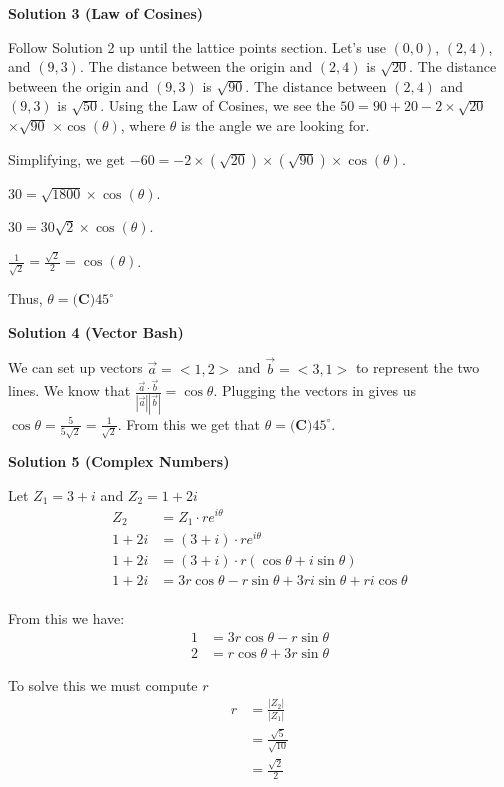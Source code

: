 \begin{enumerate}
\textbf{Solution 3 (Law of Cosines)}

Follow Solution 2 up until the lattice points section. Let's use $(0,0)$, $(2,4)$, and $(9,3)$. The distance between the origin and $(2,4)$ is $\sqrt{20}$. The distance between the origin and $(9,3)$ is $\sqrt{90}$. The distance between $(2,4)$ and $(9,3)$ is $\sqrt{50}$. Using the Law of Cosines, we see the $50 = 90 + 20 - 2\times\sqrt{20}$ $\times\sqrt{90}$ $\times\cos(\theta)$, where $\theta$ is the angle we are looking for. 

 Simplifying, we get $-60 = -2\times(\sqrt{20}) \times(\sqrt{90}) \times\cos(\theta)$.

 $30 =  \sqrt{1800} \times\cos(\theta)$.

 $30 =  30\sqrt{2} \times\cos(\theta)$.

 $\frac{1}{\sqrt{2}} = \frac{\sqrt{2}}{2}= \cos(\theta)$.

 Thus, $\theta = \boxed{\textbf{(C)} 45^\circ}$




\textbf{Solution 4 (Vector Bash)}

We can set up vectors $\vec{a} = <1,2>$ and $\vec{b} = <3,1>$ to represent the two lines. We know that $\frac{\vec{a} \cdot \vec{b}}{|\vec{a}| |\vec{b}|} = \cos \theta$. Plugging the vectors in gives us $\cos \theta = \frac{5}{5\sqrt{2}} = \frac{1}{\sqrt{2}}$.  From this we get that $\theta = \boxed{\textbf{(C)} 45^\circ}$. 

 



\textbf{Solution 5 (Complex Numbers)}

Let $Z_1 = 3 + i$ and $Z_2 = 1 + 2i$
 \begin{align*} Z_2 &= Z_1 \cdot re^{i\theta} \\ 1+2i&=(3+i) \cdot re^{i\theta} \\ 1+2i&=(3 + i) \cdot r(\cos\theta + i\sin\theta) \\ 1+2i&=3r\cos\theta - r\sin\theta  + 3ri\sin\theta + ri\cos\theta \\ \end{align*}


 From this we have:
 \begin{align} 1 &= 3r\cos\theta - r\sin\theta \\ 2 &= r\cos\theta + 3r\sin\theta  \end{align}

 To solve this we must compute $r$
 \begin{align*} r &= \frac{|Z_2|}{|Z_1|} \\ &= \frac{\sqrt{5}}{\sqrt{10}} \\ &= \frac{\sqrt{2}}{2} \end{align*}



\end{enumerate}
